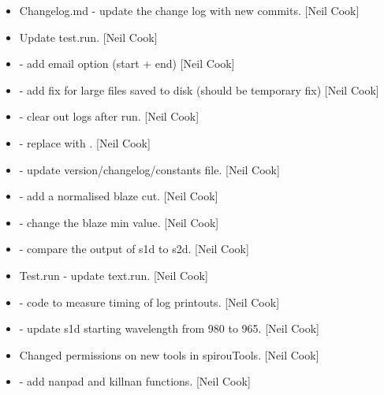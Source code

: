 \documentclass[a4paper,10pt,english]{report}
\begin{document}
\begin{itemize}
\item {} 
Changelog.md - update the change log with new commits. {[}Neil Cook{]}

\item {} 
Update test.run. {[}Neil Cook{]}

\item {} 
 - add email option (start + end) {[}Neil Cook{]}

\item {} 
 - add fix for large files saved to disk (should be
temporary fix) {[}Neil Cook{]}

\item {} 
 - clear out logs after run. {[}Neil Cook{]}

\item {} 
 - replace  with .
{[}Neil Cook{]}

\item {} 
 - update version/changelog/constants file. {[}Neil Cook{]}

\item {} 
 - add a normalised blaze cut. {[}Neil Cook{]}

\item {} 
 - change the blaze min value. {[}Neil Cook{]}

\item {} 
 - compare the output of s1d to s2d. {[}Neil Cook{]}

\item {} 
Test.run - update text.run. {[}Neil Cook{]}

\item {} 
 - code to measure timing of log printouts. {[}Neil
Cook{]}

\item {} 
 - update s1d starting wavelength from 980 to
965. {[}Neil Cook{]}

\item {} 
Changed permissions on new tools in spirouTools. {[}Neil Cook{]}

\item {} 
 - add nanpad and killnan functions. {[}Neil Cook{]}


\end{itemize}
\end{document}
